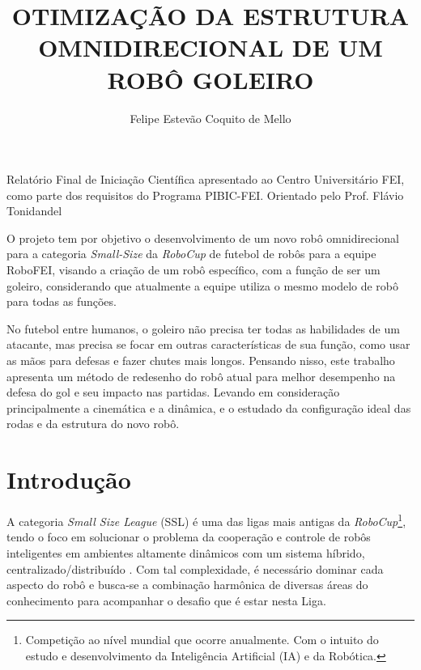 \documentclass[deposito, acronym, symbols]{fei}
\title{OTIMIZAÇÃO DA ESTRUTURA OMNIDIRECIONAL DE UM ROBÔ GOLEIRO}
\author{Felipe Estevão Coquito de Mello }
\begin{document}
\maketitle

\begin{folhaderosto}
	Relatório Final de Iniciação Científica apresentado ao Centro Universitário FEI, como parte dos requisitos do Programa PIBIC-FEI. Orientado pelo Prof. Flávio Tonidandel
\end{folhaderosto}

 \begin{resumo}

O projeto tem por objetivo o desenvolvimento de um novo robô omnidirecional para a categoria \textit{Small-Size} da \textit{RoboCup} de futebol de robôs para a equipe RoboFEI, visando a criação de um robô específico, com a função de ser um goleiro, considerando que atualmente a equipe utiliza o mesmo modelo de robô para todas as funções.

No futebol entre humanos, o goleiro não precisa ter todas as habilidades de um atacante, mas precisa se focar em outras características de sua função, como usar as mãos para defesas e fazer chutes mais longos. Pensando nisso, este trabalho apresenta um método de redesenho do robô atual para melhor desempenho na defesa do gol e seu impacto nas partidas. Levando em consideração principalmente a cinemática e a dinâmica, e o estudado da configuração ideal das rodas e da estrutura do novo robô.



\end{resumo}

\tableofcontents
\listoffigures

\chapter{Introdução}

A categoria \textit{Small Size League} (SSL) é uma das ligas mais antigas da \textit{RoboCup}\footnote[1]{Competição ao nível mundial que ocorre anualmente. Com o intuito do estudo e desenvolvimento da Inteligência Artificial (IA) e da Robótica.}, tendo o foco em solucionar o problema da cooperação e controle de robôs inteligentes em ambientes altamente dinâmicos com um sistema híbrido, centralizado/distribuído \cite{about}. Com tal complexidade, é necessário dominar cada aspecto do robô e busca-se a combinação harmônica de diversas áreas do conhecimento para acompanhar o desafio que é estar nesta Liga.
\end{document}
